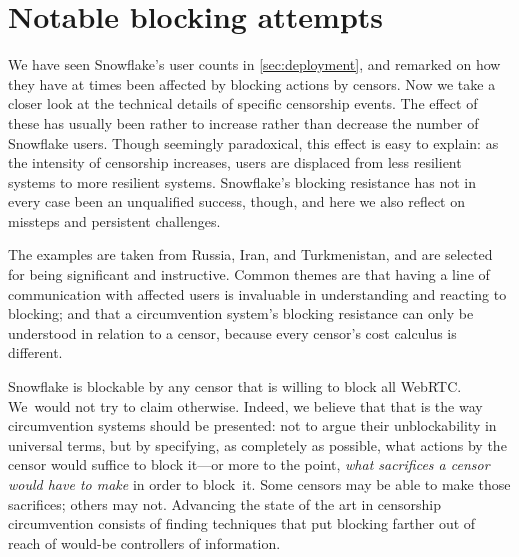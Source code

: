 \documentclass[letterpaper,twocolumn]{article}
\begin{document}

\section{Notable blocking attempts}
\label{sec:block}

We have seen Snowflake's user counts in \autoref{sec:deployment},
and remarked on how they have at times been affected by blocking actions by censors.
Now we take a closer look at the technical details of specific censorship events.
The effect of these has usually been rather to increase rather than decrease
the number of Snowflake users.
Though seemingly paradoxical, this effect is easy to explain:
as the intensity of censorship increases,
users are displaced from less resilient systems
to more resilient systems.
Snowflake's blocking resistance has not in every case been an unqualified success,
though, and here we also reflect on missteps
and persistent challenges.

The examples are taken from
Russia, Iran, and Turkmenistan,
and are selected for being significant and instructive.
Common themes are that having a line of communication
with affected users is invaluable in understanding and reacting to blocking;
and that a circumvention system's blocking resistance
can only be understood in relation to a censor,
because every censor's cost calculus is different.

Snowflake is blockable by any censor that is willing to block all WebRTC.
We~would not try to claim otherwise.
Indeed, we believe that that is the way circumvention systems
should be presented:
not to argue their unblockability in universal terms,
but by specifying, as completely as possible,
what actions by the censor would suffice to block it---or
more to the point,
\emph{what sacrifices a censor would have to make}
in order to block~it.
Some censors may be able to make those sacrifices; others may not.
Advancing the state of the art in censorship circumvention
consists of finding techniques that put blocking
farther out of reach of would-be controllers of information.
\end{document}
